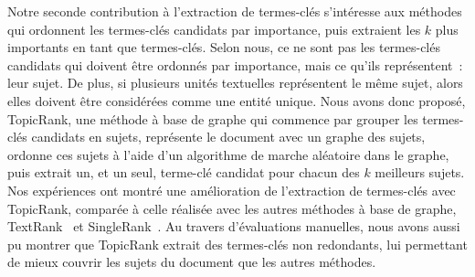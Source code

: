     Notre seconde contribution à l'extraction de termes-clés s'intéresse aux
    méthodes qui ordonnent les termes-clés candidats par importance, puis
    extraient les $k$ plus importants en tant que termes-clés. Selon nous, ce ne
    sont pas les termes-clés candidats qui doivent être ordonnés par importance,
    mais ce qu'ils représentent~: leur sujet. De plus, si plusieurs unités
    textuelles représentent le même sujet, alors elles doivent être considérées
    comme une entité unique. Nous avons donc proposé, TopicRank, une méthode à
    base de graphe qui commence par grouper les termes-clés candidats en sujets,
    représente le document avec un graphe des sujets, ordonne ces sujets à
    l'aide d'un algorithme de marche aléatoire dans le graphe, puis extrait un,
    et un seul, terme-clé candidat pour chacun des $k$ meilleurs sujets. Nos
    expériences ont montré une amélioration de l'extraction de termes-clés
    avec TopicRank, comparée à celle réalisée avec les autres méthodes à base de
    graphe, TextRank~\cite{mihalcea2004textrank} et
    SingleRank~\cite{wan2008expandrank}. Au
    travers d'évaluations manuelles, nous avons aussi pu montrer que TopicRank
    extrait des termes-clés non redondants, lui permettant de mieux couvrir les
    sujets du document que les autres méthodes.

